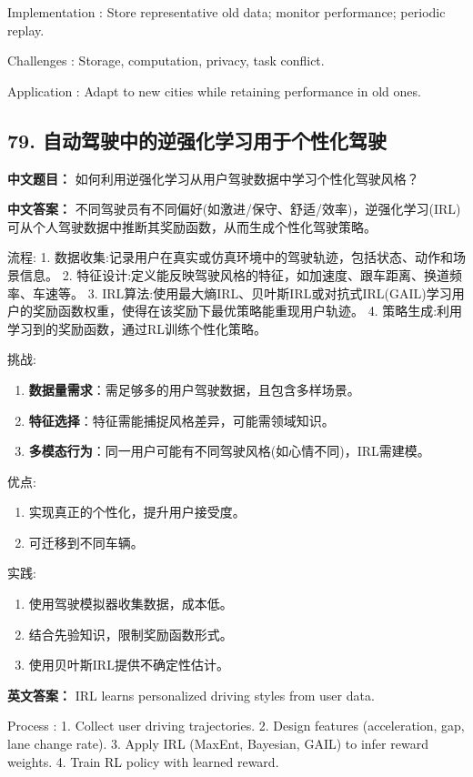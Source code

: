 \documentclass[10pt,a4paper]{ctexart}
\begin{document}
 Implementation : Store representative old data; monitor performance; periodic replay.

 Challenges : Storage, computation, privacy, task conflict.

 Application : Adapt to new cities while retaining performance in old ones.

\subsection*{79. 自动驾驶中的逆强化学习用于个性化驾驶}
\textbf{中文题目：} 如何利用逆强化学习从用户驾驶数据中学习个性化驾驶风格？

\textbf{中文答案：}  
不同驾驶员有不同偏好(如激进/保守、舒适/效率)，逆强化学习(IRL)可从个人驾驶数据中推断其奖励函数，从而生成个性化驾驶策略。

 流程:
1.  数据收集:记录用户在真实或仿真环境中的驾驶轨迹，包括状态、动作和场景信息。
2.  特征设计:定义能反映驾驶风格的特征，如加速度、跟车距离、换道频率、车速等。
3.  IRL算法:使用最大熵IRL、贝叶斯IRL或对抗式IRL(GAIL)学习用户的奖励函数权重，使得在该奖励下最优策略能重现用户轨迹。
4.  策略生成:利用学习到的奖励函数，通过RL训练个性化策略。

 挑战:
\begin{enumerate}
    \item \textbf{数据量需求}：需足够多的用户驾驶数据，且包含多样场景。
    \item \textbf{特征选择}：特征需能捕捉风格差异，可能需领域知识。
    \item \textbf{多模态行为}：同一用户可能有不同驾驶风格(如心情不同)，IRL需建模。
\end{enumerate}

 优点:
\begin{enumerate}
    \item 实现真正的个性化，提升用户接受度。
    \item 可迁移到不同车辆。
\end{enumerate}

 实践:
\begin{enumerate}
    \item 使用驾驶模拟器收集数据，成本低。
    \item 结合先验知识，限制奖励函数形式。
    \item 使用贝叶斯IRL提供不确定性估计。
\end{enumerate}

\textbf{英文答案：}  
IRL learns personalized driving styles from user data.

 Process :
1. Collect user driving trajectories.
2. Design features (acceleration, gap, lane change rate).
3. Apply IRL (MaxEnt, Bayesian, GAIL) to infer reward weights.
4. Train RL policy with learned reward.
\end{document}
